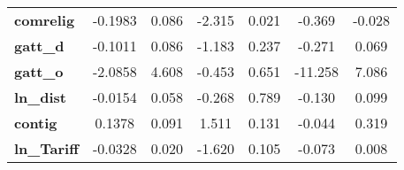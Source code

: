 \begin{center}
\begin{tabular}{lcccccc}
\textbf{comrelig}                                                  &      -0.1983  &        0.086     &    -2.315  &         0.021        &       -0.369    &       -0.028     \\
\textbf{gatt\_d}                                                   &      -0.1011  &        0.086     &    -1.183  &         0.237        &       -0.271    &        0.069     \\
\textbf{gatt\_o}                                                   &      -2.0858  &        4.608     &    -0.453  &         0.651        &      -11.258    &        7.086     \\
\textbf{ln\_dist}                                                  &      -0.0154  &        0.058     &    -0.268  &         0.789        &       -0.130    &        0.099     \\
\textbf{contig}                                                    &       0.1378  &        0.091     &     1.511  &         0.131        &       -0.044    &        0.319     \\
\textbf{ln\_Tariff}                                                &      -0.0328  &        0.020     &    -1.620  &         0.105        &       -0.073    &        0.008     \\
\bottomrule
\end{tabular}
\end{center}